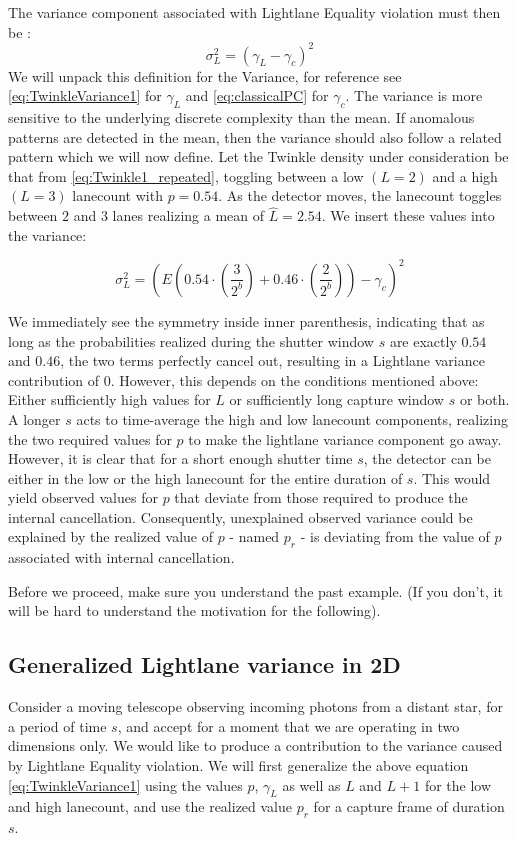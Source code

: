 \documentclass[notitlepage]{article}
\begin{document}
The variance component associated with Lightlane Equality violation must then be :
\begin{equation}
\label{eq:VarianceDefinition}
\sigma_L^2 = \left( \gamma_{L}- \gamma_c \right)^2 
\end{equation}
We will unpack this definition for the Variance, for reference see \eqref{eq:TwinkleVariance1} for $\gamma_L$ and \eqref{eq:classicalPC} for $\gamma_c$. The variance is more sensitive to the underlying discrete complexity than the mean. If anomalous patterns are detected in the mean, then the variance should also follow a related pattern which we will now define. Let the Twinkle density under consideration be that from \eqref{eq:Twinkle1_repeated}, toggling between a low $(L=2)$ and a high $(L=3)$ lanecount with $p = 0.54$. As the detector moves, the lanecount toggles between $2$ and $3$ lanes realizing a mean of $\hat{L} = 2.54$. We insert these values into the variance:

\begin{equation}
	\sigma_L^2 = \left( E\left(0.54 \cdot (\frac{3}{2^b}) + 0.46 \cdot (\frac{2 }{2^b}) \right) - \gamma_c \right)^2
	\label{eq:TwinkleVariance1}
\end{equation}

We immediately see the symmetry inside inner parenthesis, indicating that as long as the probabilities realized during the shutter window $s$ are exactly $0.54$ and $0.46$, the two terms perfectly cancel out, resulting in a Lightlane variance contribution of 0. However, this depends on the conditions mentioned above: Either sufficiently high values for $L$ or sufficiently long capture window $s$ or both. A longer $s$ acts to time-average the high and low lanecount components, realizing the two required values for $p$ to make the lightlane variance component go away. However, it is clear that for a short enough shutter time $s$, the detector can be either in the low or the high lanecount for the entire duration of $s$. This would yield observed values for $p$ that deviate from those required to produce the internal cancellation. Consequently, unexplained observed variance could be explained by the realized value of $p$ - named $p_r$ - is deviating from the value of $p$ associated with internal cancellation.

Before we proceed, make sure you understand the past example. (If you don't, it will be hard to understand the motivation for the following). 

\subsection{Generalized Lightlane variance in 2D}
Consider a moving telescope observing incoming photons from a distant star, for a period of time $s$, and accept for a moment that we are operating in two dimensions only. We would like to produce a contribution to the variance caused by Lightlane Equality violation. We will first generalize the above equation \eqref{eq:TwinkleVariance1} using the values $p$, $\gamma_L$ as well as $L$ and $L+1$ for the low and high lanecount, and use the realized value $p_r$ for a capture frame of duration $s$. 
\end{document}
